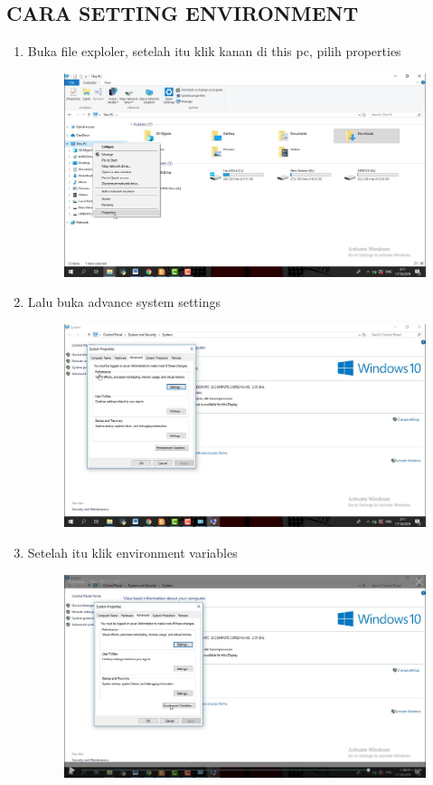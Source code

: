 \begin{enumerate}
\begin{enumerate}
\begin{enumerate}
\section*{CARA SETTING ENVIRONMENT}
\begin{enumerate}
\item  Buka file exploler, setelah itu klik kanan di this pc, pilih properties
\begin{figure}[h]
    \centering
    \includegraphics[scale=0.2]{gambar/25.png}
    \caption{}
    \label{fig:my_label}
\end{figure}
\item Lalu buka advance system settings
\begin{figure}[h]
    \centering
    \includegraphics[scale=0.2]{gambar/26.png}
    \caption{}
    \label{fig:my_label}
\end{figure}
\item Setelah itu klik environment variables
\begin{figure}[h]
    \centering
    \includegraphics[scale=0.2]{gambar/27.png}

\end{figure}
\end{enumerate}
\end{enumerate}
\end{enumerate}
\end{enumerate}
